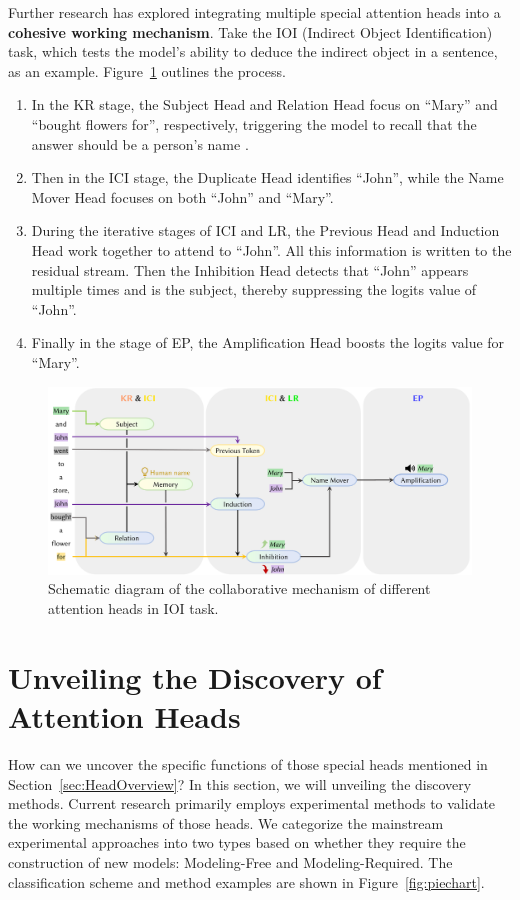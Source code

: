 \documentclass{article}
\begin{document}
Further research has explored integrating multiple special attention heads into a \textbf{cohesive working mechanism}. Take the IOI (Indirect Object Identification) task, which tests the model's ability to deduce the indirect object in a sentence, as an example. Figure~\ref{fig:IOIexample} outlines the process.
\begin{enumerate}
    \item In the KR stage, the Subject Head and Relation Head focus on ``Mary'' and ``bought flowers for'', respectively, triggering the model to recall that the answer should be a person's name \citep{FactualRecall_24_arXiv_Independent}.

    \item Then in the ICI stage, the Duplicate Head identifies ``John'', while the Name Mover Head focuses on both ``John'' and ``Mary''.

    \item During the iterative stages of ICI and LR, the Previous Head and Induction Head work together to attend to ``John''. All this information is written to the residual stream. Then the Inhibition Head detects that ``John'' appears multiple times and is the subject, thereby suppressing the logits value of ``John''.
    \item Finally in the stage of EP, the Amplification Head boosts the logits value for ``Mary''.
\end{enumerate}
\begin{figure}[htbp]
    \centering
    \includegraphics[width=0.85\linewidth]{figures/IOIExample.pdf}
    \caption{Schematic diagram of the collaborative mechanism of different attention heads in IOI task.}
    \label{fig:IOIexample}
\end{figure}


\section{Unveiling the Discovery of Attention Heads} \label{sec:DiscoveryExp}
How can we uncover the specific functions of those special heads mentioned in Section~\ref{sec:HeadOverview}? In this section, we will unveiling the discovery methods. Current research primarily employs experimental methods to validate the working mechanisms of those heads. We categorize the mainstream experimental approaches into two types based on whether they require the construction of new models: Modeling-Free and Modeling-Required. The classification scheme and method examples are shown in Figure~\ref{fig:piechart}.
\end{document}

